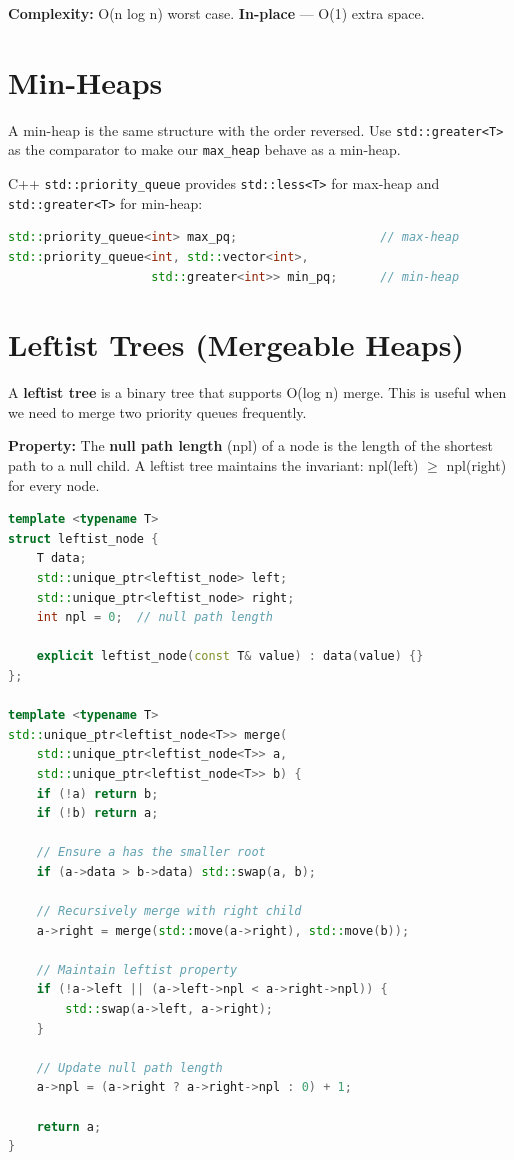 \textbf{Complexity:} O(n log n) worst case. \textbf{In-place} — O(1) extra space.

\section{Min-Heaps}

A min-heap is the same structure with the order reversed. Use \texttt{std::greater<T>} as the comparator to make our \texttt{max\_heap} behave as a min-heap.

C++ \texttt{std::priority\_queue} provides \texttt{std::less<T>} for max-heap and \texttt{std::greater<T>} for min-heap:

\begin{lstlisting}[language=C++]
std::priority_queue<int> max_pq;                    // max-heap
std::priority_queue<int, std::vector<int>,
                    std::greater<int>> min_pq;      // min-heap
\end{lstlisting}

\section{Leftist Trees (Mergeable Heaps)}

A \textbf{leftist tree} is a binary tree that supports O(log n) merge. This is useful when we need to merge two priority queues frequently.

\textbf{Property:} The \textbf{null path length} (npl) of a node is the length of the shortest path to a null child. A leftist tree maintains the invariant: npl(left) $\ge $ npl(right) for every node.

\begin{lstlisting}[language=C++]
template <typename T>
struct leftist_node {
    T data;
    std::unique_ptr<leftist_node> left;
    std::unique_ptr<leftist_node> right;
    int npl = 0;  // null path length

    explicit leftist_node(const T& value) : data(value) {}
};

template <typename T>
std::unique_ptr<leftist_node<T>> merge(
    std::unique_ptr<leftist_node<T>> a,
    std::unique_ptr<leftist_node<T>> b) {
    if (!a) return b;
    if (!b) return a;

    // Ensure a has the smaller root
    if (a->data > b->data) std::swap(a, b);

    // Recursively merge with right child
    a->right = merge(std::move(a->right), std::move(b));

    // Maintain leftist property
    if (!a->left || (a->left->npl < a->right->npl)) {
        std::swap(a->left, a->right);
    }

    // Update null path length
    a->npl = (a->right ? a->right->npl : 0) + 1;

    return a;
}
\end{lstlisting}

